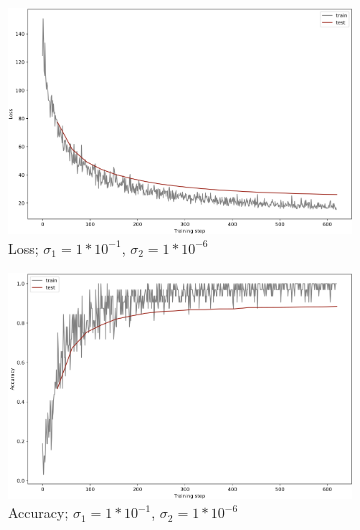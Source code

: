 \begin{figure}[]
     \centering
     \begin{subfigure}[b]{0.48\textwidth}
         \centering
         \includegraphics[width=\textwidth]{observational/img/bnn/sigmas/LC_s0.1_s1e-06.png}
         \caption{Loss; $\sigma_1=1*10^{-1}$, $\sigma_2=1*10^{-6}$}
     \end{subfigure}
     \hfill
     \begin{subfigure}[b]{0.48\textwidth}
         \centering
         \includegraphics[width=\textwidth]{observational/img/bnn/sigmas/AC_s0.1_s1e-06.png}
         \caption{Accuracy; $\sigma_1=1*10^{-1}$, $\sigma_2=1*10^{-6}$}
     \end{subfigure} 
     \par\bigskip
     \begin{subfigure}[b]{0.48\textwidth}
         \centering

\end{subfigure}
\end{figure}
